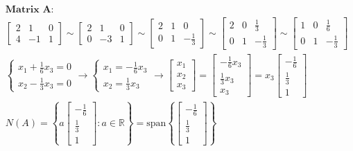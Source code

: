\documentclass{article}
\begin{document}
\begin{align*}
&\textbf{Matrix A:}
\\
&\begin{bmatrix} 2 & 1 & 0 \\ 4 & -1 & 1 \end{bmatrix} \sim 
\begin{bmatrix} 2 & 1 & 0 \\ 0 & -3 & 1 \end{bmatrix} \sim 
\begin{bmatrix} 2 & 1 & 0 \\ 0 & 1 & -\frac{1}{3} \end{bmatrix} \sim
\begin{bmatrix} 2 & 0 & \frac{1}{3} \\ 0 & 1 & -\frac{1}{3} \end{bmatrix} \sim
\begin{bmatrix} 1 & 0 & \frac{1}{6} \\ 0 & 1 & -\frac{1}{3} \end{bmatrix}
\\
&\begin{cases} x_{1} + \frac{1}{6}x_{3} = 0 \\ x_{2} - \frac{1}{3}x_{3} = 0 \end{cases} \rightarrow 
\begin{cases} x_{1} = -\frac{1}{6}x_{3} \\ x_{2} = \frac{1}{3}x_{3} \end{cases} \rightarrow 
\begin{bmatrix} x_{1} \\ x_{2} \\ x_{3} \end{bmatrix} = 
\begin{bmatrix} -\frac{1}{6}x_{3} \\ \frac{1}{3}x_{3} \\ x_{3} \end{bmatrix} = 
x_{3}\begin{bmatrix} -\frac{1}{6} \\ \frac{1}{3} \\ 1 \end{bmatrix}
\\
&N(A) = \left\{a\begin{bmatrix} -\frac{1}{6} \\ \frac{1}{3} \\ 1 \end{bmatrix} : a \in \mathbb{R}\right\} = 
\text{span}\left\{\begin{bmatrix} -\frac{1}{6} \\ \frac{1}{3} \\ 1 \end{bmatrix}\right\}

\end{align*}
\end{document}
